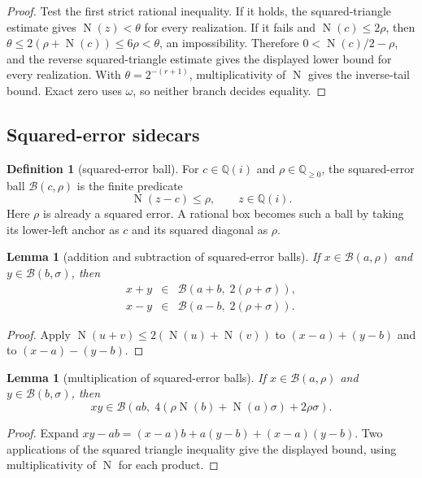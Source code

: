 \documentclass[10pt]{article}
\newtheorem{lemma}[theorem]{Lemma}
\theoremstyle{definition}
\newtheorem{definition}[theorem]{Definition}
\theoremstyle{remark}
\newcommand{\Q}{\mathbb{Q}}
\newcommand{\Qi}{\mathbb{Q}(i)}
\newcommand{\Norm}{\operatorname{N}}
\begin{document}
\begin{proof}
Test the first strict rational inequality.  If it holds, the squared-triangle
estimate gives $\Norm(z)<\theta$ for every realization.  If it fails and
$\Norm(c)\le2\rho$, then
$\theta\le2(\rho+\Norm(c))\le6\rho<\theta$, an impossibility.
Therefore $0<\Norm(c)/2-\rho$, and the reverse squared-triangle estimate
gives the displayed lower bound for every realization.  With
$\theta=2^{-(r+1)}$, multiplicativity of $\Norm$ gives the inverse-tail
bound.  Exact zero uses $\omega$, so neither branch decides equality.
\end{proof}

\subsection{Squared-error sidecars}

\begin{definition}[squared-error ball]
For $c\in\Qi$ and $\rho\in\Q_{\ge0}$, the squared-error ball
$\mathcal B(c,\rho)$ is the finite predicate
\[
 \Norm(z-c)\le\rho,
 \qquad z\in\Qi.
\tag{2.12}
\]
Here $\rho$ is already a squared error.  A rational box becomes such a ball by taking its lower-left anchor as $c$ and its squared diagonal as $\rho$.
\end{definition}

\begin{lemma}[addition and subtraction of squared-error balls]
If $x\in\mathcal B(a,\rho)$ and $y\in\mathcal B(b,\sigma)$, then
\[
\begin{array}{rcl}
 x+y&\in&\mathcal B(a+b,\;2(\rho+\sigma)),\\
 x-y&\in&\mathcal B(a-b,\;2(\rho+\sigma)).
\end{array}
\tag{2.13}
\]
\end{lemma}

\begin{proof}
Apply $\Norm(u+v)\le2(\Norm(u)+\Norm(v))$ to
$(x-a)+(y-b)$ and to $(x-a)-(y-b)$.
\end{proof}

\begin{lemma}[multiplication of squared-error balls]
If $x\in\mathcal B(a,\rho)$ and $y\in\mathcal B(b,\sigma)$, then
\[
 xy\in\mathcal B\!\left(ab,\;
 4(\rho\Norm(b)+\Norm(a)\sigma)+2\rho\sigma\right).
\tag{2.13a}
\]
\end{lemma}

\begin{proof}
Expand $xy-ab=(x-a)b+a(y-b)+(x-a)(y-b)$.  Two applications of the
squared triangle inequality give the displayed bound, using
multiplicativity of $\Norm$ for each product.
\end{proof}
\end{document}
